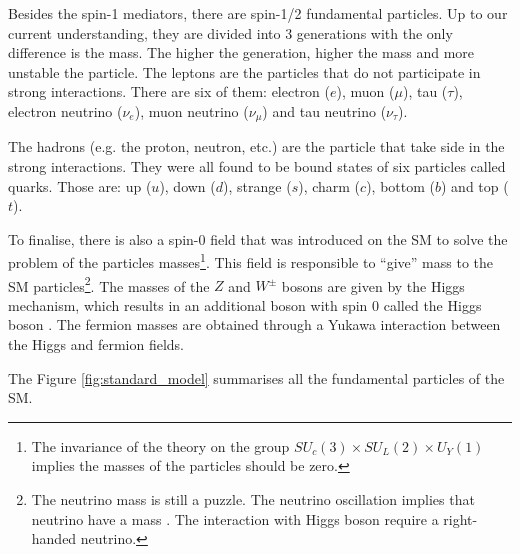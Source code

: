 Besides the spin-1 mediators, there are spin-1/2 fundamental particles. Up to our current understanding, they are divided into 3 generations with the only difference is the mass. The higher the generation, higher the mass and more unstable the particle. The leptons are the particles that do not participate in strong interactions. There are six of them: electron ($e$), muon ($\mu$), tau ($\tau$), electron neutrino ($\nu_e$), muon neutrino ($\nu_\mu$) and tau neutrino ($\nu_\tau$).

The hadrons (e.g. the proton, neutron, etc.) are the particle that take side in the strong interactions. They were all found to be bound states of six particles called quarks. Those are: up ($u$), down ($d$), strange ($s$), charm ($c$), bottom ($b$) and top ($t$).

To finalise, there is also a spin-0 field that was introduced on the SM to solve the problem of the particles masses\footnote{The invariance of the theory on the group $SU_c(3) \times SU_L(2) \times U_Y(1)$ implies the masses of the particles should be zero.}. This field is responsible to ``give'' mass to the SM particles\footnote{The neutrino mass is still a puzzle. The neutrino oscillation implies that neutrino have a mass \cite{Pontecorvo:1957cp, Pontecorvo:1967fh, PhysRevLett.81.1562}. The interaction with Higgs boson require a right-handed neutrino.}. The masses of the $Z$ and $W^\pm$ bosons are given by the Higgs mechanism, which results in an additional boson with spin 0 called the Higgs boson \cite{PhysRevLett.13.585, PhysRevLett.13.508, PhysRevLett.13.321}. The fermion masses are obtained through a Yukawa interaction between the Higgs and fermion fields.

The Figure \ref{fig:standard_model} summarises all the fundamental particles of the SM.

